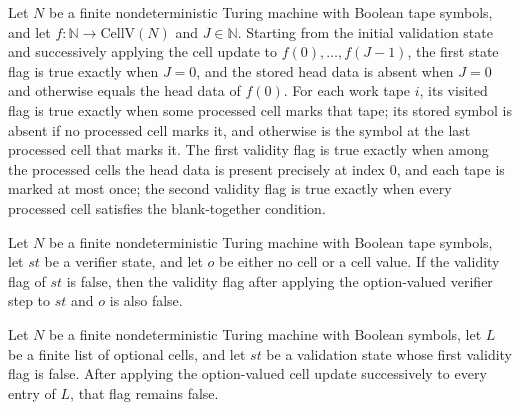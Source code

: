 \begin{theorem}
\label{Complexity.Codec.foldl_vStep}
\leanok
{}
Let $N$ be a finite nondeterministic Turing machine with Boolean tape symbols, and let
$f:\mathbb{N}\to\mathrm{CellV}(N)$ and $J\in\mathbb{N}$. Starting from the initial
validation state and successively applying the cell update to $f(0),\ldots,f(J-1)$, the
first state flag is true exactly when $J=0$, and the stored head data is absent when
$J=0$ and otherwise equals the head data of $f(0)$. For each work tape $i$, its visited
flag is true exactly when some processed cell marks that tape; its stored symbol is
absent if no processed cell marks it, and otherwise is the symbol at the last processed
cell that marks it. The first validity flag is true exactly when among the processed
cells the head data is present precisely at index $0$, and each tape is marked at most
once; the second validity flag is true exactly when every processed cell satisfies the
blank-together condition.
\end{theorem}

\begin{lemma}
\label{Complexity.Codec.vStepO_ok_false}
\leanok
{}
Let $N$ be a finite nondeterministic Turing machine with Boolean tape symbols, let $st$
be a verifier state, and let $o$ be either no cell or a cell value. If the validity flag
of $st$ is false, then the validity flag after applying the option-valued verifier step
to $st$ and $o$ is also false.
\end{lemma}

\begin{lemma}
\label{Complexity.Codec.foldl_vStepO_ok_false}
\leanok
{}
Let $N$ be a finite nondeterministic Turing machine with Boolean symbols, let $L$ be a
finite list of optional cells, and let $st$ be a validation state whose first validity
flag is false. After applying the option-valued cell update successively to every entry
of $L$, that flag remains false.
\end{lemma}

